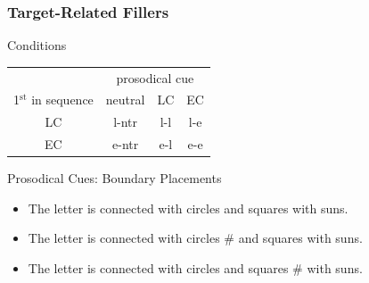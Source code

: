 \documentclass[fleqn,10pt,xcolor=dvipsnames]{beamer}
\newcommand{\LC}{LC\xspace}
\newcommand{\EC}{EC\xspace}
\begin{document}
\begin{frame}
  \frametitle{Target-Related Fillers}

  \begin{block}{Conditions}
    \begin{center}
      \begin{tabular}{cccc}
        & \multicolumn{3}{c}{prosodical cue} \\ \cmidrule(r){2-4}
        1$^{\mathrm{st}}$ in sequence & neutral & \LC & \EC \\ \midrule
        \LC & l-ntr & l-l & l-e \\
        \EC & e-ntr & e-l & e-e \\
      \end{tabular}
    \end{center}
  \end{block}

  \begin{block}{Prosodical Cues: Boundary Placements}
    \begin{itemize}
      \item[ntr:] The letter is connected with circles and squares with
        suns.
      \item[LC:] The letter is connected with circles \# and squares with
        suns.
      \item[EC:] The letter is connected with circles and squares \# with
        suns.
    \end{itemize}
  \end{block}

\end{frame}
\end{document}

